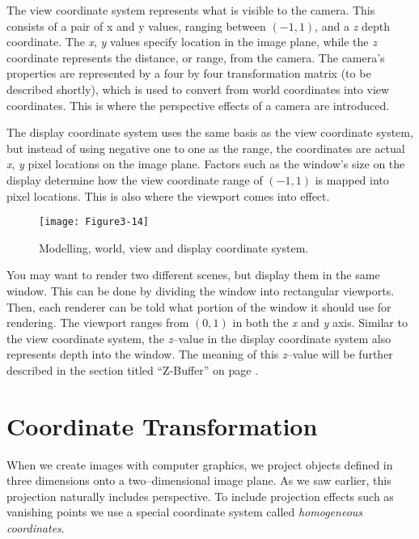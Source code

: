 The view coordinate system represents what is visible to the camera. This consists of a pair of x and y values, ranging between $(-1,1)$, and a \emph{z} depth coordinate. The \emph{x}, \emph{y} values specify location in the image plane, while the \emph{z} coordinate represents the distance, or range, from the camera. The camera's properties are represented by a four by four transformation matrix (to be described shortly), which is used to convert from world coordinates into view coordinates. This is where the perspective effects of a camera are introduced.

The display coordinate system uses the same basis as the view coordinate system, but instead of using negative one to one as the range, the coordinates are actual \emph{x}, \emph{y} pixel locations on the image plane. Factors such as the window's size on the display determine how the view coordinate range of $(-1,1)$ is mapped into pixel locations. This is also where the viewport comes into effect.

\begin{figure}[!htb]
  \centering
  \texttt{[image: Figure3-14]}\\
  \caption{ Modelling, world, view and display coordinate system.}\label{fig:Figure3-14}
\end{figure}

You may want to render two different scenes, but display them in the same window. This can be done by dividing the window into rectangular viewports. Then, each renderer can be told what portion of the window it should use for rendering. The viewport ranges from $(0,1)$ in both the \emph{x} and \emph{y} axis. Similar to the view coordinate system, the \emph{z}--value in the display coordinate system also represents depth into the window. The meaning of this \emph{z}--value will be further described in the section titled ``Z-Buffer'' on page \pageref{Z-Buffer}.


\section{Coordinate Transformation}

When we create images with computer graphics, we project objects defined in three dimensions onto a two--dimensional image plane. As we saw earlier, this projection naturally includes perspective. To include projection effects such as vanishing points we use a special coordinate system called \emph{homogeneous coordinates}.

